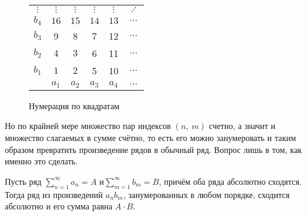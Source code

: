 \documentclass[a4paper, 12pt]{article}
\begin{document}
	\begin{wrapfigure}{l}{0.3\linewidth}
		\begin{tabular}[t]{c|ccccc}
			$\vdots$ & $\vdots$ & $\vdots$ & $\vdots$ &$\vdots$& $\iddots$ \\
			$b_4$ & $16$ & $15$ & $14$ & $13$ &$\dots$\\
			$b_3$ & 9 & 8 & 7 &  12&$\dots$ \\
			$b_2$ & $4$ & $3$ & 6 & 11&$\dots$ \\
			$b_1$ & $1$ & $2$ & 5 & 10& $\dots $\\
			\hline
			& $a_1$ & $a_2$ & $a_3$ & $a_4$ &$\dots$ 
		\end{tabular}
		\caption{Нумерация по квадратам}
		\vspace{-40pt}
	\end{wrapfigure}
	Но по крайней мере множество пар индексов $(n,\ m)$ счетно, а значит и множество слагаемых в сумме счётно, то есть его можно занумеровать и таким образом превратить произведение рядов в обычный ряд. Вопрос лишь в том, как именно это сделать.
	
	\begin{Theorem}
		Пусть ряд $\sum\limits_{n=1}^{\infty}a_n =A $ и$ \sum\limits_{m=1}^{\infty}b_m = B$, причём оба ряда абсолютно сходятся. Тогда ряд из произведений $a_nb_m$, занумерованных в любом порядке, сходится абсолютно и его сумма равна $A\cdot B$.
	\end{Theorem}
\end{document}
